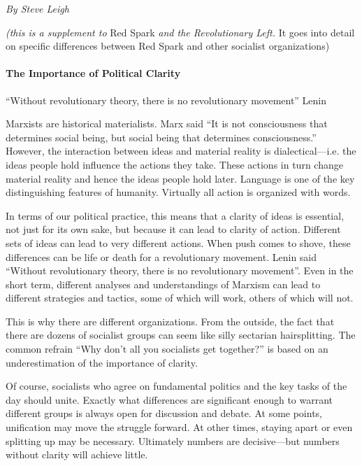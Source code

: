 \emph{By Steve Leigh}

\emph{(this is a supplement to} Red Spark \emph{and the Revolutionary Left.} It goes into detail on specific differences between Red Spark and other socialist organizations)

\paragraph{The Importance of Political Clarity}

``Without revolutionary theory, there is no revolutionary movement'' Lenin

Marxists are historical materialists. Marx said ``It is not consciousness that determines social being, but social being that determines consciousness.'' However, the interaction between ideas and material reality is dialectical---i.e. the ideas people hold influence the actions they take. These actions in turn change material reality and hence the ideas people hold later. Language is one of the key distinguishing features of humanity. Virtually all action is organized with words.

In terms of our political practice, this means that a clarity of ideas is essential, not just for its own sake, but because it can lead to clarity of action. Different sets of ideas can lead to very different actions. When push comes to shove, these differences can be life or death for a revolutionary movement. Lenin said ``Without revolutionary theory, there is no revolutionary movement''. Even in the short term, different analyses and understandings of Marxism can lead to different strategies and tactics, some of which will work, others of which will not.

This is why there are different organizations. From the outside, the fact that there are dozens of socialist groups can seem like silly sectarian hairsplitting. The common refrain ``Why don't all you socialists get together?'' is based on an underestimation of the importance of clarity.

Of course, socialists who agree on fundamental politics and the key tasks of the day should unite. Exactly what differences are significant enough to warrant different groups is always open for discussion and debate. At some points, unification may move the struggle forward. At other times, staying apart or even splitting up may be necessary. Ultimately numbers are decisive---but numbers without clarity will achieve little.

